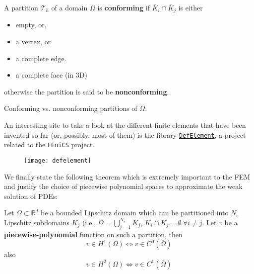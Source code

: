 \begin{definition}
	A partition $\mathcal{T}_h$ of a domain $\Omega$ is \textbf{ conforming} if $\bar{K}_i \cap \bar{K}_j$ is either
	\begin{itemize}
		\item empty, or,
		\item a vertex, or
		\item a complete edge.
		\item a complete face (in 3D)
	\end{itemize}
	otherwise the partition is said to be \textbf{ nonconforming}.
\end{definition}
\begin{marginfigure}[-10.0cm]
	\scalebox{1.3}{}
	\caption[]{Conforming vs. nonconforming partitions of $\Omega$.}
\end{marginfigure}


An interesting site to take a look at the different finite elements that have been invented 
so far (or, possibly, most of them) is the library \href{https://defelement.com/}{\texttt{DefElement}},
a project related to the \texttt{FEniCS} project.

\begin{figure}[ht!!]
\begin{center}
\texttt{[image: defelement]}
\end{center}
\end{figure}

We finally state the following theorem which is extremely important to the
FEM and justify the choice of piecewise polynomial spaces to approximate
the weak solution of PDEs:

\begin{theorem}
	Let $\Omega \subset \mathbb{R}^d$ be a bounded Lipschitz domain which can be
	partitioned into $N_e$ Lipschitz subdomains $K_j$ (i.e., $\overline{\Omega} = \bigcup_{j=1}^{N_e} \bar{K}_j$,	$K_i \cap K_j = \emptyset ~\forall i\ne j$. Let $v$ be a \textbf{ piecewise-polynomial} function on such a partition, then
	\begin{equation}
	v \in H^{1}(\Omega) \iff v \in C^0(\overline{\Omega}) \nonumber
	\end{equation}
	also
	\begin{equation}
	v \in H^{2}(\Omega) \iff v \in C^1(\overline{\Omega}) \nonumber
	\end{equation}
\end{theorem}



